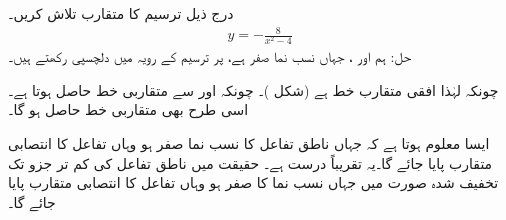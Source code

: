 درج ذیل ترسیم کا متقارب تلاش کریں۔
\begin{align*}
y=-\frac{8}{x^2-4}
\end{align*}
حل:\quad
ہم  اور ، جہاں نسب نما صفر ہے، پر ترسیم کے رویہ میں دلچسپی رکھتے ہیں۔

چونکہ   لہٰذا افقی متقارب خط  ہے (شکل )۔ چونکہ  اور  سے  متقاربی خط حاصل ہوتا ہے۔اسی طرح  بھی متقاربی خط حاصل ہو گا۔ 

ایسا معلوم ہوتا ہے کہ جہاں ناطق تفاعل کا نسب نما صفر ہو وہاں تفاعل کا انتصابی متقارب پایا جائے گا۔یہ تقریباً درست ہے۔ حقیقت میں ناطق تفاعل کی کم تر جزو تک تخفیف شدہ  صورت میں جہاں نسب نما کا صفر ہو وہاں تفاعل کا انتصابی متقارب پایا جائے گا۔

